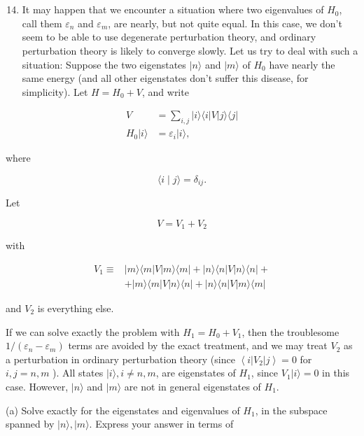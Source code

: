 \documentclass[12pt]{article}
\begin{document}
\section{}
\begin{enumerate}
  \setcounter{enumi}{13}
  \item It may happen that we encounter a situation where two eigenvalues of $H_{0}$, call them $\varepsilon_{n}$ and $\varepsilon_{m}$, are nearly, but not quite equal. In this case, we don't seem to be able to use degenerate perturbation theory, and ordinary perturbation theory is likely to converge slowly. Let us try to deal with such a situation: Suppose the two eigenstates $|n\rangle$ and $|m\rangle$ of $H_{0}$ have nearly the same energy (and all other eigenstates don't suffer this disease, for simplicity). Let $H=H_{0}+V$, and write
\end{enumerate}

$$
\begin{aligned}
V & =\sum_{i, j}|i\rangle\langle i|V| j\rangle\langle j| \\
H_{0}|i\rangle & =\varepsilon_{i}|i\rangle,
\end{aligned}
$$

where

$$
\langle i \mid j\rangle=\delta_{i j} .
$$

Let

$$
V=V_{1}+V_{2}
$$

with

$$
\begin{aligned}
V_{1} \equiv & |m\rangle\langle m|V| m\rangle\langle m|+| n\rangle\langle n|V| n\rangle\langle n|+ \\
& +|m\rangle\langle m|V| n\rangle\langle n|+| n\rangle\langle n|V| m\rangle\langle m|
\end{aligned}
$$

and $V_{2}$ is everything else.

If we can solve exactly the problem with $H_{1}=H_{0}+V_{1}$, then the troublesome $1 /\left(\varepsilon_{n}-\varepsilon_{m}\right)$ terms are avoided by the exact treatment, and we may treat $V_{2}$ as a perturbation in ordinary perturbation theory (since $\left\langle i\left|V_{2}\right| j\right\rangle=0$ for $i, j=n, m$ ). All states $|i\rangle, i \neq n, m$, are eigenstates of $H_{1}$, since $V_{1}|i\rangle=0$ in this case. However, $|n\rangle$ and $|m\rangle$ are not in general eigenstates of $H_{1}$.

(a) Solve exactly for the eigenstates and eigenvalues of $H_{1}$, in the subspace spanned by $|n\rangle,|m\rangle$. Express your answer in terms of
\end{document}
